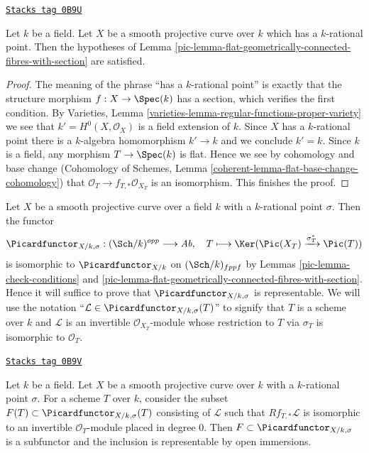 \begin{lemma}
\label{pic-lemma-check-conditions}
\href{https://stacks.math.columbia.edu/tag/0B9U}{\texttt{Stacks tag 0B9U}}

Let $k$ be a field. Let $X$ be a smooth projective curve over $k$
which has a $k$-rational point. Then the hypotheses of
Lemma \ref{pic-lemma-flat-geometrically-connected-fibres-with-section}
are satisfied.
\end{lemma}

\begin{proof}
The meaning of the phrase ``has a $k$-rational point'' is exactly that
the structure morphism $f : X \to \Spec(k)$ has a section, which
verifies the first condition.
By Varieties, Lemma \ref{varieties-lemma-regular-functions-proper-variety}
we see that $k' = H^0(X, \mathcal{O}_X)$ is a field extension of $k$.
Since $X$ has a $k$-rational point there is a $k$-algebra homomorphism
$k' \to k$ and we conclude $k' = k$.
Since $k$ is a field, any morphism $T \to \Spec(k)$ is flat.
Hence we see by cohomology and base change
(Cohomology of Schemes, Lemma \ref{coherent-lemma-flat-base-change-cohomology})
that $\mathcal{O}_T \to f_{T, *}\mathcal{O}_{X_T}$ is an isomorphism.
This finishes the proof.
\end{proof}

Let $X$ be a smooth projective curve over a field $k$ with a
$k$-rational point $\sigma$. Then the functor
$$
\Picardfunctor_{X/k, \sigma} : (\Sch/k)^{opp} \longrightarrow \textit{Ab},\quad
T \longmapsto \Ker(\Pic(X_T) \xrightarrow{\sigma_T^*} \Pic(T))
$$
is isomorphic to $\Picardfunctor_{X/k}$ on $(\Sch/k)_{fppf}$
by Lemmas \ref{pic-lemma-check-conditions} and
\ref{pic-lemma-flat-geometrically-connected-fibres-with-section}.
Hence it will suffice to prove that $\Picardfunctor_{X/k, \sigma}$
is representable. We will use the notation
``$\mathcal{L} \in \Picardfunctor_{X/k, \sigma}(T)$'' to signify that
$T$ is a scheme over $k$ and $\mathcal{L}$ is an invertible
$\mathcal{O}_{X_T}$-module whose restriction to $T$ via $\sigma_T$
is isomorphic to $\mathcal{O}_T$.

\begin{lemma}
\label{pic-lemma-define-open}
\href{https://stacks.math.columbia.edu/tag/0B9V}{\texttt{Stacks tag 0B9V}}

Let $k$ be a field. Let $X$ be a smooth projective curve over $k$
with a $k$-rational point $\sigma$. For a scheme $T$ over $k$,
consider the subset $F(T) \subset \Picardfunctor_{X/k, \sigma}(T)$ consisting of
$\mathcal{L}$ such that $Rf_{T, *}\mathcal{L}$ is isomorphic to an invertible
$\mathcal{O}_T$-module placed in degree $0$. Then
$F \subset \Picardfunctor_{X/k, \sigma}$ is a subfunctor and the inclusion is
representable by open immersions.
\end{lemma}

